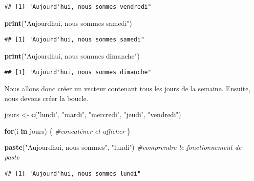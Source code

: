\documentclass[
]{book}
\newenvironment{Shaded}{\begin{snugshade}}{\end{snugshade}}
\newcommand{\CommentTok}[1]{\textcolor[rgb]{0.56,0.35,0.01}{\textit{#1}}}
\newcommand{\ControlFlowTok}[1]{\textcolor[rgb]{0.13,0.29,0.53}{\textbf{#1}}}
\newcommand{\FunctionTok}[1]{\textcolor[rgb]{0.13,0.29,0.53}{\textbf{#1}}}
\newcommand{\NormalTok}[1]{#1}
\newcommand{\OtherTok}[1]{\textcolor[rgb]{0.56,0.35,0.01}{#1}}
\newcommand{\StringTok}[1]{\textcolor[rgb]{0.31,0.60,0.02}{#1}}
\begin{document}
\begin{verbatim}
## [1] "Aujourd'hui, nous sommes vendredi"
\end{verbatim}

\begin{Shaded}
\begin{Highlighting}[]
\FunctionTok{print}\NormalTok{(}\StringTok{"Aujourd\textquotesingle{}hui, nous sommes samedi"}\NormalTok{)}
\end{Highlighting}
\end{Shaded}

\begin{verbatim}
## [1] "Aujourd'hui, nous sommes samedi"
\end{verbatim}

\begin{Shaded}
\begin{Highlighting}[]
\FunctionTok{print}\NormalTok{(}\StringTok{"Aujourd\textquotesingle{}hui, nous sommes dimanche"}\NormalTok{)}
\end{Highlighting}
\end{Shaded}

\begin{verbatim}
## [1] "Aujourd'hui, nous sommes dimanche"
\end{verbatim}

Nous allons donc créer un vecteur contenant tous les jours de la semaine. Ensuite, nous devons créer la boucle.

\begin{Shaded}
\begin{Highlighting}[]
\NormalTok{jours }\OtherTok{\textless{}{-}} \FunctionTok{c}\NormalTok{(}\StringTok{"lundi"}\NormalTok{, }\StringTok{"mardi"}\NormalTok{, }\StringTok{"mercredi"}\NormalTok{, }\StringTok{"jeudi"}\NormalTok{, }\StringTok{"vendredi"}\NormalTok{)}

\ControlFlowTok{for}\NormalTok{(i }\ControlFlowTok{in}\NormalTok{ jours) \{}
  \CommentTok{\#concaténer et afficher}
\NormalTok{\}}

\FunctionTok{paste}\NormalTok{(}\StringTok{"Aujourd\textquotesingle{}hui, nous sommes"}\NormalTok{, }\StringTok{"lundi"}\NormalTok{) }\CommentTok{\#comprendre le fonctionnement de paste}
\end{Highlighting}
\end{Shaded}

\begin{verbatim}
## [1] "Aujourd'hui, nous sommes lundi"
\end{verbatim}
\end{document}
